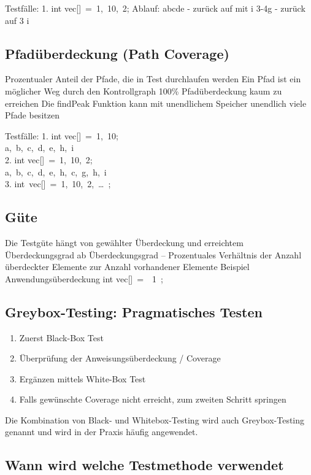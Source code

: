Testfälle:
1. int vec[] = {1, 10, 2};
Ablauf: abcde - zurück auf mit i 3-4g - zurück auf 3 i

\subsection{Pfadüberdeckung (Path Coverage)}
Prozentualer Anteil der Pfade, die in Test 
durchlaufen werden
Ein Pfad ist ein möglicher Weg durch den 
Kontrollgraph
100\% Pfadüberdeckung kaum zu erreichen
Die findPeak Funktion kann mit unendlichem 
Speicher unendlich viele Pfade besitzen

Testfälle:
1. int vec[] = {1, 10}; \\
 a, b, c, d, e, h, i \\
2. int vec[] = {1, 10, 2}; \\
 a, b, c, d, e, h, c, g, h, i \\
3. int vec[] = {1, 10, 2, … }; \\

\subsection{Güte}
Die Testgüte hängt von gewählter Überdeckung und erreichtem Überdeckungsgrad ab
Überdeckungsgrad – Prozentuales Verhältnis der Anzahl überdeckter Elemente zur Anzahl vorhandener 
Elemente
Beispiel Anwendungsüberdeckung
int vec[] = { 1 };

\subsection{Greybox-Testing: Pragmatisches Testen}
\begin{enumerate}
	\item Zuerst Black-Box Test
	\item Überprüfung der Anweisungsüberdeckung / Coverage
	\item Ergänzen mittels White-Box Test
	\item Falls gewünschte Coverage nicht erreicht, zum zweiten Schritt springen
\end{enumerate}

Die Kombination von Black- und Whitebox-Testing wird auch Greybox-Testing genannt und wird in der Praxis häufig angewendet.

\subsection{Wann wird welche Testmethode verwendet}

